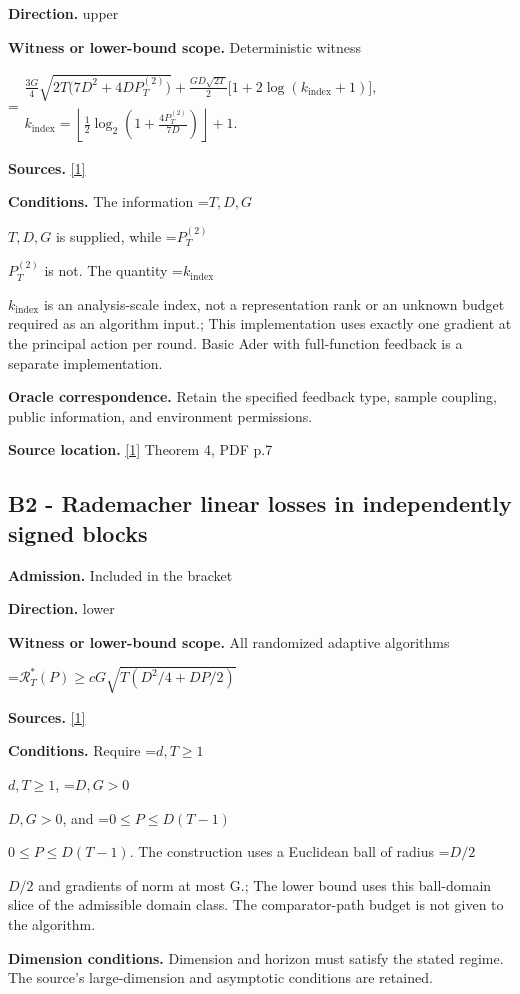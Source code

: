 \documentclass[10pt,a4paper]{article}
\newcommand{\AtlasMath}[1]{\par\begingroup\centering\setbox0=\hbox{$\displaystyle #1$}\ifdim\wd0>1.4\linewidth\typeout{ATLAS WIDE FORMULA: \the\wd0}\fi\ifdim\wd0>\linewidth\resizebox{\linewidth}{!}{\box0}\else\box0\fi\par\endgroup}
\newcommand{\AtlasInlineMath}[1]{\begingroup\setbox0=\hbox{$#1$}\ifdim\wd0>.4\linewidth\endgroup\AtlasMath{#1}\else\endgroup$#1$\fi}
\begin{document}
\textbf{Direction.} upper

\textbf{Witness or lower-bound scope.} Deterministic witness

\AtlasMath{\begin{gathered}\frac{3G}{4}\sqrt{2T\bigl(7D^2+4DP_T^{(2)}\bigr)}+\frac{GD\sqrt{2T}}2\bigl[1+2\log(k_{\mathrm{index}}+1)\bigr],\\ k_{\mathrm{index}}=\left\lfloor\frac12\log_2\!\left(1+\frac{4P_T^{(2)}}{7D}\right)\right\rfloor+1.\end{gathered}}
\textbf{Sources.} \href{https://www.lamda.nju.edu.cn/lusy/pdf/zhang2018adaptive.pdf}{[1]}

\textbf{Conditions.} The information \AtlasInlineMath{T,D,G} is supplied, while \AtlasInlineMath{P_T^{(2)}} is not. The quantity \AtlasInlineMath{k_{\mathrm{index}}} is an analysis-scale index, not a representation rank or an unknown budget required as an algorithm input.; This implementation uses exactly one gradient at the principal action per round. Basic Ader with full-function feedback is a separate implementation.

\textbf{Oracle correspondence.} Retain the specified feedback type, sample coupling, public information, and environment permissions.

\textbf{Source location.} \href{https://www.lamda.nju.edu.cn/lusy/pdf/zhang2018adaptive.pdf}{[1]} Theorem 4, PDF p.7

\subsection{B2 - Rademacher linear losses in independently signed blocks}
\textbf{Admission.} Included in the bracket

\textbf{Direction.} lower

\textbf{Witness or lower-bound scope.} All randomized adaptive algorithms

\AtlasMath{\mathcal R_T^*(P)\ge cG\sqrt{T(D^2/4+DP/2)}}
\textbf{Sources.} \href{https://www.lamda.nju.edu.cn/lusy/pdf/zhang2018adaptive.pdf}{[1]}

\textbf{Conditions.} Require \AtlasInlineMath{d,T\ge1}, \AtlasInlineMath{D,G>0}, and \AtlasInlineMath{0\le P\le D(T-1)}. The construction uses a Euclidean ball of radius \AtlasInlineMath{D/2} and gradients of norm at most G.; The lower bound uses this ball-domain slice of the admissible domain class. The comparator-path budget is not given to the algorithm.

\textbf{Dimension conditions.} Dimension and horizon must satisfy the stated regime. The source's large-dimension and asymptotic conditions are retained.
\end{document}
